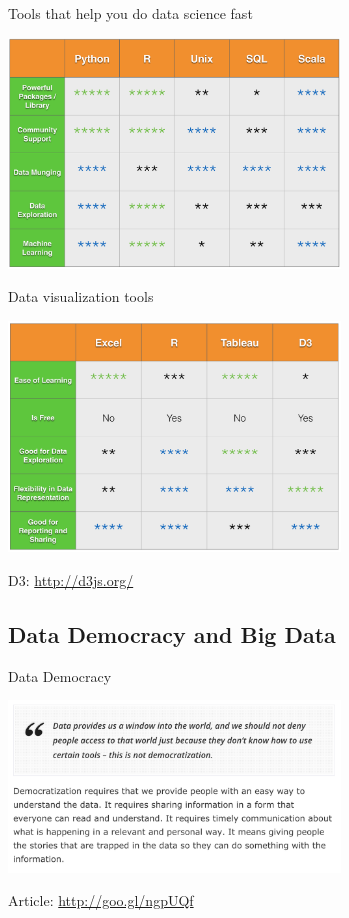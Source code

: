\documentclass[10pt]{beamer}
\begin{document}
    \begin{frame}{Tools that help you do data science fast}
      \begin{center}
         \includegraphics[width=250pt]{../graphs/data_tools}
      \end{center}
    \end{frame}

    \begin{frame}{Data visualization tools}
      \begin{center}
         \includegraphics[width=250pt]{../graphs/data_visualization_tools}
      \end{center}
      \centerline{\footnotesize D3: \url{http://d3js.org/}}
    \end{frame}

  \subsection{Data Democracy and Big Data}

    \begin{frame}{Data Democracy}
          \begin{center}
             \includegraphics[width=250pt]{../graphs/data_democratization}
          \end{center}
        \centerline{\footnotesize Article: \url{http://goo.gl/ngpUQf}}
    \end{frame}
\end{document}
